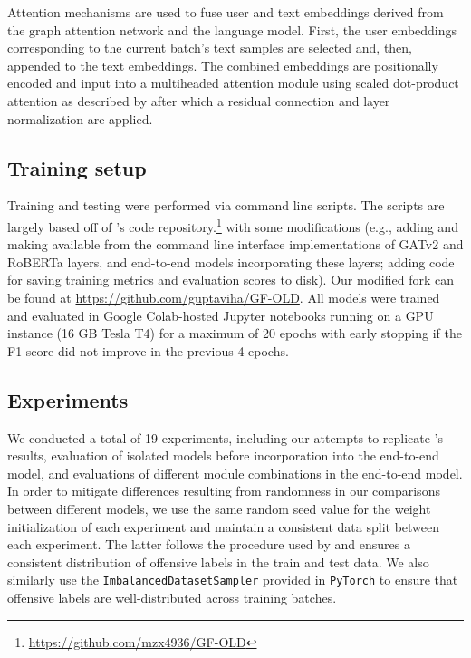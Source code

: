 \documentclass[letterpaper]{article} %
\begin{document}
Attention mechanisms are used to fuse user and text embeddings derived from the graph attention network and the language model. First, the user embeddings corresponding to the current batch's text samples are selected and, then, appended to the text embeddings. The combined embeddings are positionally encoded and input into a multiheaded attention module using scaled dot-product attention as described by \citet{Vaswani2017} after which a residual connection and layer normalization are applied.

\subsection{Training setup}

Training and testing were performed via command line scripts. The scripts are largely based off of \citet{Miao2022}'s code repository.\footnote{\url{https://github.com/mzx4936/GF-OLD}} with some modifications (e.g., adding and making available from the command line interface implementations of GATv2 and RoBERTa layers, and end-to-end models incorporating these layers; adding code for saving training metrics and evaluation scores to disk). Our modified fork can be found at \url{https://github.com/guptaviha/GF-OLD}. All models were trained and evaluated in Google Colab-hosted Jupyter notebooks running on a GPU instance (16 GB Tesla T4) for a maximum of 20 epochs with early stopping if the F1 score did not improve in the previous 4 epochs.

\subsection{Experiments}

We conducted a total of 19 experiments, including our attempts to replicate \citet{Miao2022}'s results, evaluation of isolated models before incorporation into the end-to-end model, and evaluations of different module combinations in the end-to-end model. In order to mitigate differences resulting from randomness in our comparisons between different models, we use the same random seed value for the weight initialization of each experiment and maintain a consistent data split between each experiment. The latter follows the procedure used by \citet{Miao2022} and ensures a consistent distribution of offensive labels in the train and test data. We also similarly use the \verb|ImbalancedDatasetSampler| provided in \verb|PyTorch| to ensure that offensive labels are well-distributed across training batches. 
\end{document}
